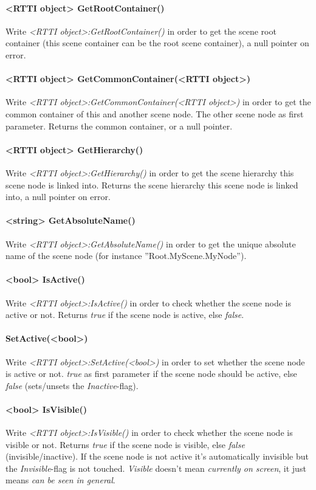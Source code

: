 \paragraph{<RTTI object> GetRootContainer()}
Write \emph{<RTTI object>:GetRootContainer()} in order to get the scene root container (this scene container can be the root scene container), a null pointer on error.

\paragraph{<RTTI object> GetCommonContainer(<RTTI object>)}
Write \emph{<RTTI object>:GetCommonContainer(<RTTI object>)} in order to get the common container of this and another scene node. The other scene node as first parameter. Returns the common container, or a null pointer.

\paragraph{<RTTI object> GetHierarchy()}
Write \emph{<RTTI object>:GetHierarchy()} in order to get the scene hierarchy this scene node is linked into. Returns the scene hierarchy this scene node is linked into, a null pointer on error.

\paragraph{<string> GetAbsoluteName()}
Write \emph{<RTTI object>:GetAbsoluteName()} in order to get the unique absolute name of the scene node (for instance ''Root.MyScene.MyNode'').

\paragraph{<bool> IsActive()}
Write \emph{<RTTI object>:IsActive()} in order to check whether the scene node is active or not. Returns \emph{true} if the scene node is active, else \emph{false}.

\paragraph{SetActive(<bool>)}
Write \emph{<RTTI object>:SetActive(<bool>)} in order to set whether the scene node is active or not. \emph{true} as first parameter if the scene node should be active, else \emph{false} (sets/unsets the \emph{Inactive}-flag).

\paragraph{<bool> IsVisible()}
Write \emph{<RTTI object>:IsVisible()} in order to check whether the scene node is visible or not. Returns \emph{true} if the scene node is visible, else \emph{false} (invisible/inactive). If the scene node is not active it's automatically invisible but the \emph{Invisible}-flag is not touched. \emph{Visible} doesn't mean \emph{currently on screen}, it just means \emph{can be seen in general}.

